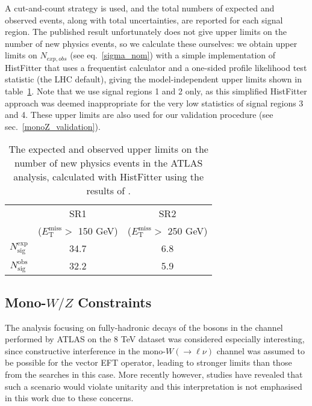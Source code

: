 A cut-and-count strategy is used, and the total numbers of expected and observed events, along with total uncertainties, are reported for each signal region. The published result unfortunately does not give upper limits on the number of new physics events, so we calculate these ourselves: we obtain upper limits on $N_{exp,obs}$ (see eq.~\ref{sigma_nom}) with a simple implementation of HistFitter that uses a frequentist calculator and a one-sided profile likelihood test statistic (the LHC default), giving the model-independent upper limits shown in table~\ref{tab:Nlim_monoZ}. Note that we use signal regions 1 and 2 only, as this simplified HistFitter approach was deemed inappropriate for the very low statistics of signal regions 3 and 4. These upper limits are also used for our validation procedure (see sec.~\ref{monoZ_validation}).

\begin{table}
\begin{center}
\begin{tabular}{ c  c  c }
\hline
\hline
& SR1 & SR2 \T \\
& ($E_{\mathrm{T}}^{\mathrm{miss}} > $ 150 GeV) & ($E_{\mathrm{T}}^{\mathrm{miss}} > $ 250 GeV) \B \\
\hline
$N_{\mathrm{sig}}^{\mathrm{exp}}$ & 34.7 & 6.8 \T \\
$N_{\mathrm{sig}}^{\mathrm{obs}}$ & 32.2 & 5.9 \B \\
\hline
\hline
\end{tabular}
\end{center}
\label{tab:Nlim_monoZ}
\caption{The expected and observed upper limits on the number of new physics events in the ATLAS \monoZ analysis, calculated with HistFitter using the results of \cite{Aad:2014monoZlep}.}
\end{table}

\subsection{Mono-$W/Z$ Constraints}
\label{monoWZ_constraints}

The analysis focusing on fully-hadronic decays of the bosons in the \monoWZ channel performed by ATLAS on the 8 TeV dataset was considered especially interesting, since constructive interference in the mono-$W(\rightarrow \ell \nu)$ channel was assumed to be possible for the vector EFT operator, leading to stronger limits than those from the \monojet searches in this case. More recently however, studies have revealed that such a scenario would violate unitarity and this interpretation is not emphasised in this work due to these concerns.

